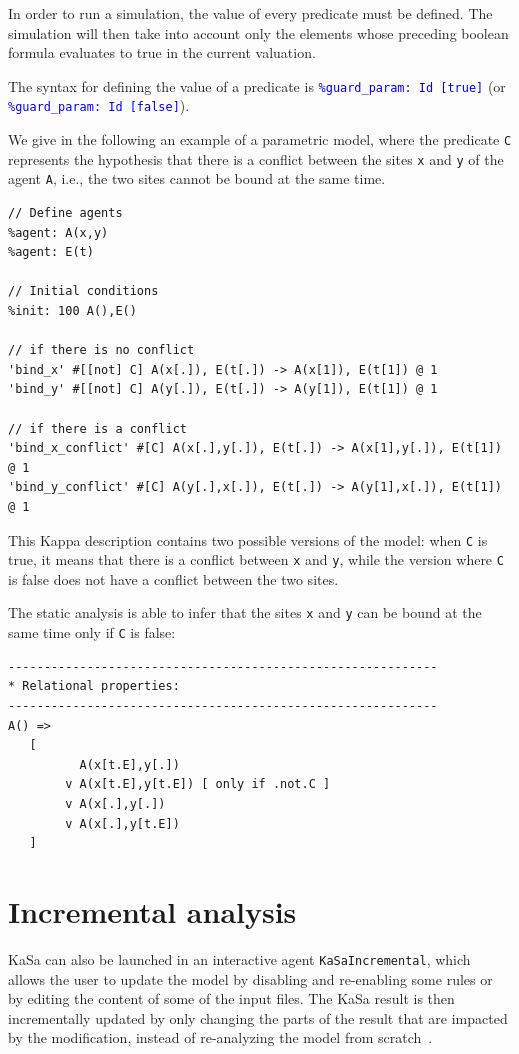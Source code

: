 \documentclass[11pt]{book}
\def\KaSa{\textsf{KaSa}}
\def\tcb#1{\textcolor{blue}{\ttt{#1}}}
\def\ttt#1{\texttt{#1}}
\begin{document}
In order to run a simulation, the value of every predicate must be defined. The simulation will then take into account only the elements whose preceding boolean formula evaluates to true in the current valuation. 

The syntax for defining the value of a predicate is \tcb{\%guard\_param: Id [true]} (or \tcb{\%guard\_param: Id [false]}).

We give in the following an example of a parametric model, where the predicate \ttt{C} represents the hypothesis that there is a conflict between the sites \ttt{x} and \ttt{y} of the agent \ttt{A}, i.e., the two sites cannot be bound at the same time.

\begin{lstlisting}[language=kappa]
// Define agents
%agent: A(x,y)
%agent: E(t)

// Initial conditions
%init: 100 A(),E()

// if there is no conflict
'bind_x' #[[not] C] A(x[.]), E(t[.]) -> A(x[1]), E(t[1]) @ 1
'bind_y' #[[not] C] A(y[.]), E(t[.]) -> A(y[1]), E(t[1]) @ 1

// if there is a conflict
'bind_x_conflict' #[C] A(x[.],y[.]), E(t[.]) -> A(x[1],y[.]), E(t[1]) @ 1
'bind_y_conflict' #[C] A(y[.],x[.]), E(t[.]) -> A(y[1],x[.]), E(t[1]) @ 1
\end{lstlisting}

This Kappa description contains two possible versions of the model: when \ttt{C} is true, it means that there is a conflict between \ttt{x} and \ttt{y}, while the version where \ttt{C} is false does not have a conflict between the two sites.

The static analysis is able to infer that the sites \ttt{x} and \ttt{y} can be bound at the same time only if \ttt{C} is false:

\begin{verbatim}
------------------------------------------------------------
* Relational properties:
------------------------------------------------------------
A() =>
   [
          A(x[t.E],y[.])
        v A(x[t.E],y[t.E]) [ only if .not.C ]
        v A(x[.],y[.])
        v A(x[.],y[t.E])
   ]
\end{verbatim}

\section{Incremental analysis}

\KaSa{} can also be launched in an interactive agent \ttt{KaSaIncremental}, which allows the user to update the model by disabling and re-enabling some rules or by editing the content of some of the input files.
The \KaSa{} result is then incrementally updated by only changing the parts of the result that are impacted by the modification, instead of re-analyzing the model from scratch~\cite{cmsb2026FG}.
\end{document}
